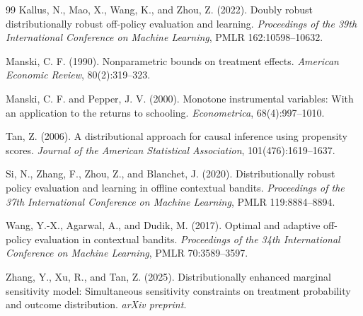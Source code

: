 \documentclass[11pt]{article}
\theoremstyle{definition}
\theoremstyle{plain}
\theoremstyle{remark}
\begin{document}
\begin{thebibliography}{99}
Kallus, N., Mao, X., Wang, K., and Zhou, Z. (2022).
Doubly robust distributionally robust off-policy evaluation and learning.
\emph{Proceedings of the 39th International Conference on Machine Learning},
PMLR 162:10598--10632.

Manski, C. F. (1990).
Nonparametric bounds on treatment effects.
\emph{American Economic Review}, 80(2):319--323.

Manski, C. F. and Pepper, J. V. (2000).
Monotone instrumental variables: With an application to the returns to schooling.
\emph{Econometrica}, 68(4):997--1010.

Tan, Z. (2006).
A distributional approach for causal inference using propensity scores.
\emph{Journal of the American Statistical Association}, 101(476):1619--1637.

Si, N., Zhang, F., Zhou, Z., and Blanchet, J. (2020).
Distributionally robust policy evaluation and learning in offline contextual
bandits.
\emph{Proceedings of the 37th International Conference on Machine Learning},
PMLR 119:8884--8894.

Wang, Y.-X., Agarwal, A., and Dudik, M. (2017).
Optimal and adaptive off-policy evaluation in contextual bandits.
\emph{Proceedings of the 34th International Conference on Machine Learning}, PMLR 70:3589--3597.

Zhang, Y., Xu, R., and Tan, Z. (2025).
Distributionally enhanced marginal sensitivity model: Simultaneous sensitivity constraints on treatment probability and outcome distribution.
\emph{arXiv preprint}.
\end{thebibliography}
\end{document}
